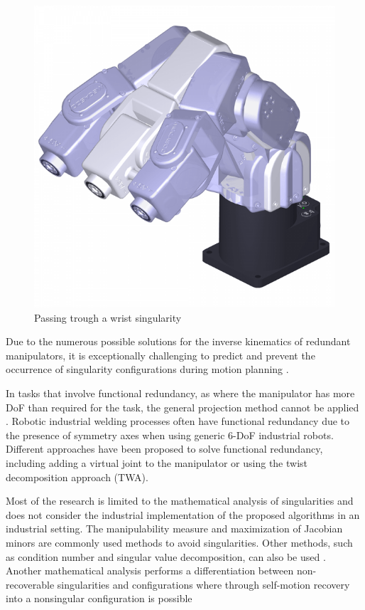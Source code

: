 \begin{figure}[H]
	\centerline{\includegraphics[scale=.25]{figures/wristsingular.png}}
	\caption{Passing trough a wrist singularity \cite{meca}}
	\label{wristsingular}
\end{figure}

Due to the numerous possible solutions for the inverse kinematics of redundant manipulators, it is exceptionally challenging to predict and prevent the occurrence of singularity configurations during motion planning \cite{Shi.2021}.

In tasks that involve functional redundancy, as where the manipulator has more DoF than required for the task, the general projection method cannot be applied \cite{Wei.2014}. Robotic industrial welding processes often have functional redundancy due to the presence of symmetry axes when using generic 6-DoF industrial robots. Different approaches have been proposed to solve functional redundancy, including adding a virtual joint to the manipulator or using the twist decomposition approach (TWA).

Most of the research is limited to the mathematical analysis of singularities and does not consider the industrial implementation of the proposed algorithms in an industrial setting. The manipulability measure and maximization of Jacobian minors are commonly used methods to avoid singularities. Other methods, such as condition number and singular value decomposition, can also be used \cite{Stevenson.}. Another mathematical analysis performs a differentiation between non-recoverable singularities and configurations where through self-motion recovery into a nonsingular configuration is possible \cite{Bedrossian.2002}

